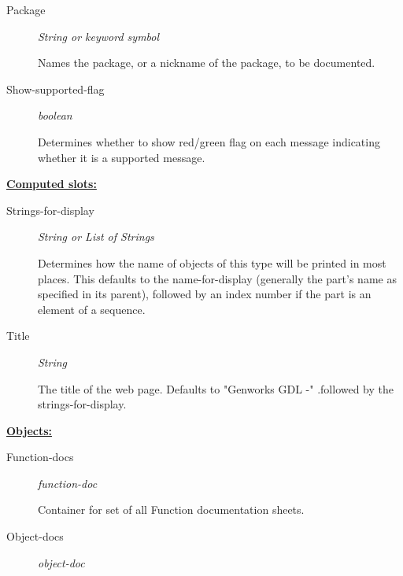 \documentclass [11pt]{book}
\begin{document}
\begin{itemize}
\begin{description}
\item [Package]
\emph{String or keyword symbol}

 Names the package, or a nickname of the package, to be documented.




\item [Show-supported-flag]
\emph{boolean}

 Determines whether to show red/green flag on each message indicating whether it is a
supported message.




\end{description}






\textbf{
\underline{Computed slots:}}

\begin{description}

\item [Strings-for-display]
\emph{String or List of Strings}

 Determines how the name of objects of
this type will be printed in most places.  This defaults to the
name-for-display (generally the part's name as specified in its
parent), followed by an index number if the part is an element of a
sequence.




\item [Title]
\emph{String}

 The title of the web page. Defaults to "Genworks GDL -"
.followed by the strings-for-display.




\end{description}






\textbf{
\underline{Objects:}}

\begin{description}

\item [Function-docs]
\emph{function-doc}

 Container for set of all Function documentation sheets.




\item [Object-docs]
\emph{object-doc}


\end{description}
\end{itemize}
\end{document}
